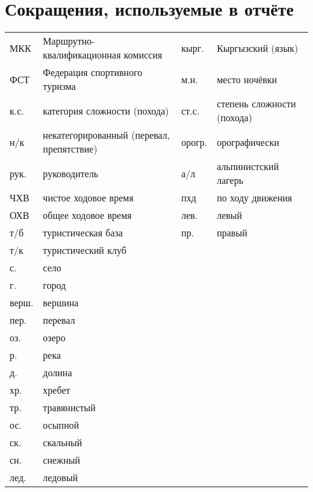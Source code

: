 \section*{Сокращения, используемые в отчёте}
\begin{table}[h!]
\centering
\begin{tabular}{p{} p{} | p{} p{}}
	МКК                                  &   Маршрутно-квалификационная комиссия  &	кырг.	&	Кыргызский (язык)	\\
	ФСТ                                &   Федерация спортивного туризма  & м.н. & место ночёвки \\
	к.с.                               &   категория сложности (похода) & 
	ст.с.							& степень сложности (похода) \\
	н/к                            &   некатегорированный (перевал, препятствие) &	орогр.                &   орографически \\
	рук. &   руководитель &а/л                  &   альпинистский лагерь  \\
	ЧХВ                          &   чистое ходовое время  &пхд	&	по ходу движения \\
	ОХВ                          &   общее ходовое время  & лев.	& левый \\
	т/б                         &   туристическая база & пр. &   правый \\
	т/к                         &   туристический клуб &  &    \\
		с. & село & & \\
	г. & город & & \\
	верш.               &   вершина & & \\
	пер.               &   перевал & & \\
	оз.             &   озеро & & \\
	р.             &   река & & \\
	д.	&	долина & &\\
	хр. &   хребет& & \\
	тр. &   травянистый & &\\
	ос. &   осыпной& & \\
	ск. &   скальный & &\\
	сн. &   снежный & &\\
	лед. &   ледовый & &\\	
\end{tabular}
\end{table}
\clearpage
